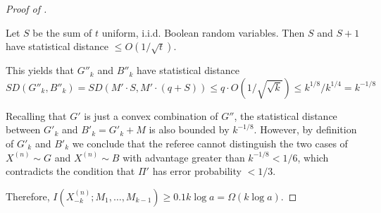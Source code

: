 \documentclass{toc}
\newcommand{\follows}{\ensuremath{\sim}}
\newcommand{\bigo}[1]{\ensuremath{{{O} \left( {#1} \right)}}}
\newcommand{\bigomega}[1]{\ensuremath{{\Omega \left( {#1} \right)}}}
\begin{document}
\begin{proof}[Proof of ]
\begin{claim}
Let $S$ be the sum of $t$ uniform, i.i.d. Boolean random variables.
Then $S$ and $S+1$ have statistical distance $\le \bigo{1/\sqrt{t}}$. 
\end{claim}

This yields that $G''_k$ and $B''_k$ have statistical distance 
$$SD(G''_k, B''_k)=SD(M' \cdot S, M'\cdot(q+S))\le q\cdot \bigo{1/\sqrt{\sqrt{k}}}\le k^{1/8}/k^{1/4}=k^{-1/8}$$

Recalling that $G'$ is just a convex combination of $G''$, 
the statistical distance between $G'_k$ and $B'_k=G'_k+M$ is also bounded by $k^{-1/8}$. 
%
However, by definition of $G'_k$ and $B'_k$ we conclude that the referee cannot distinguish the two cases of $X^{(n)}\follows G$ and $X^{(n)}\follows B$ with advantage greater than $k^{-1/8}< 1/6$, which contradicts the condition that $\Pi'$ has error probability $<1/3$.
		
Therefore, 
$I\left(X^{(n)}_{-k}; M_1,\ldots, M_{k-1}\right)\ge 0.1 k\log a=\bigomega{k\log a}$.
\end{proof}	

\nocite{conf-version}


%
%
%
%

\end{document}
